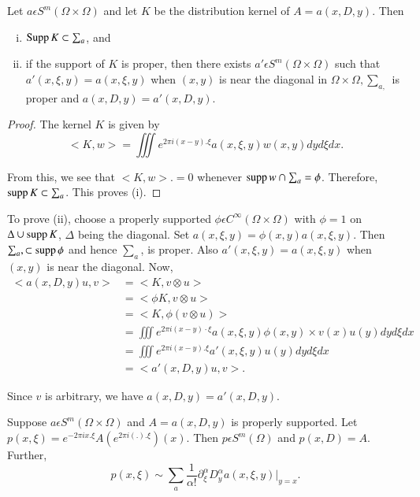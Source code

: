 \setcounter{prop}{26}
\begin{prop}%
  Let $a \epsilon S^m (\Omega \times \Omega)$ and let $K$ be the
  distribution kernel of $A=a(x,D,y)$. Then

  \begin{enumerate}[i)]
  \item $\operatorname{Supp} K \subset \sum_a$, and 
  \item if the support of $K$ is proper, then there exists $a'
    \epsilon S^m (\Omega \times \Omega)$ such that $a'(x,\xi,y)=a(x,
    \xi,y)$ when $(x,y)$ is near the diagonal in $\Omega \times \Omega,
    \sum_{a,}$ is proper and $a(x,D,y)=a' (x,D,y)$. 
  \end{enumerate}
\end{prop}

\begin{proof}
  The kernel $K$ is given by
  $$
  <K,w>= \iiint e^{2 \pi i (x-y). \xi} a (x,\xi, y)w (x,y)dy d\xi dx.
  $$
  
  From this, we see that $<K,w>.=0$ whenever $\operatorname{supp} w \cap
  \sum_a=\phi$. Therefore, $\operatorname{supp} K \subset \sum_a$. This proves (i). 
\end{proof}

To prove (ii), choose a properly supported $\phi \epsilon C^
\infty (\Omega \times \Omega)$ with $\phi =1$ on $\Delta \cup \operatorname{supp} K$,
$\Delta$ being the diagonal. Set $a(x, \xi, y)= \phi (x,y)a (x,
\xi, y)$. Then $\sum_a, \subset  \operatorname{supp} \phi$ and hence $\sum_a$, is
proper. Also $a'(x, \xi, y)= a(x, \xi,y)$ when $(x,y)$ is near the
diagonal. Now, 
\begin{align*}
  <a (x,D,y)u,v> &= <K,v \otimes u>\\
  &= < \phi K,v \otimes u>\\
  &= < K, \phi (v \otimes u)>\\
  &= \iiint e^{2 \pi i (x-y)\cdot \xi} a (x, \xi, y) \phi (x,y) \times v(x)u
  (y)dy d \xi dx\\ 
  &= \iiint e^{2 \pi i (x-y). \xi}a' (x, \xi, y)u(y)dy d \xi dx \\
  &= <a'(x,D,y)u,v>.
 \end{align*}\pageoriginale
 
Since $v$ is arbitrary, we have $a (x,D,y)=a'(x,D,y)$.

\setcounter{thm}{27}
\begin{thm}\label{chap4:sec5:thm4.28}%
  Suppose $a \epsilon S^m (\Omega \times \Omega)$ and $A=a
  (x,D,y)$ is properly supported. Let $p(x, \xi)=e^{-2 \pi i x.\xi}
  A(e^{2 \pi i(.). \xi})(x)$. Then $p \epsilon S^m (\Omega)$ and $p
  (x,D)=A$. Further, 
  $$
  p(x,\xi) \sim \sum_a \frac {1}{\alpha !} \partial ^ \alpha _ \xi D^
  \alpha _y a (x, \xi, y)|_{y=x}. 
  $$ 
\end{thm}

